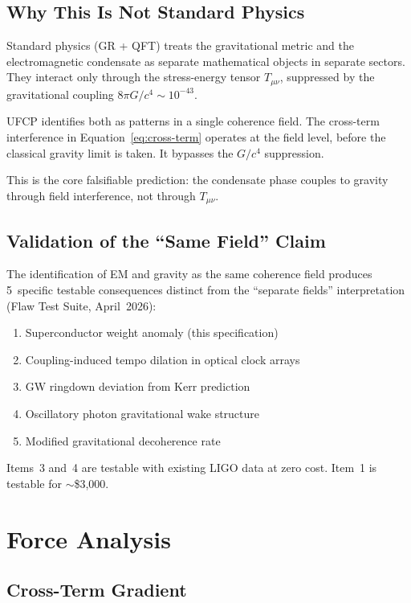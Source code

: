\documentclass[11pt, a4paper]{article}
\begin{document}
\subsection{Why This Is Not Standard Physics}

Standard physics (GR + QFT) treats the gravitational metric
and the electromagnetic condensate as separate mathematical
objects in separate sectors. They interact only through the
stress-energy tensor $T_{\mu\nu}$, suppressed by the
gravitational coupling $8\pi G/c^4 \sim 10^{-43}$.

UFCP identifies both as patterns in a single coherence field.
The cross-term interference in Equation~\ref{eq:cross-term}
operates at the field level, before the classical gravity
limit is taken. It bypasses the $G/c^4$ suppression.

This is the core falsifiable prediction: the condensate phase
couples to gravity through field interference, not through
$T_{\mu\nu}$.

\subsection{Validation of the ``Same Field'' Claim}

The identification of EM and gravity as the same coherence
field produces 5~specific testable consequences distinct from
the ``separate fields'' interpretation (Flaw Test Suite,
April~2026):
\begin{enumerate}[nosep]
  \item Superconductor weight anomaly (this specification)
  \item Coupling-induced tempo dilation in optical clock arrays
  \item GW ringdown deviation from Kerr prediction
  \item Oscillatory photon gravitational wake structure
  \item Modified gravitational decoherence rate
\end{enumerate}

Items~3 and~4 are testable with existing LIGO data at zero
cost. Item~1 is testable for $\sim$\$3{,}000.

\section{Force Analysis}

\subsection{Cross-Term Gradient}
\end{document}
